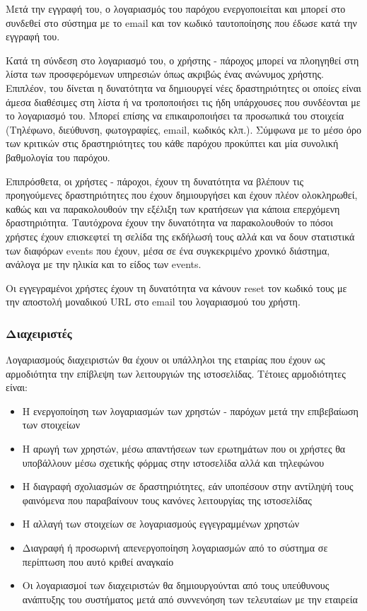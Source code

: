 \documentclass[letterpaper,6pt]{article}
\begin{document}
Μετά την εγγραφή του, ο λογαριασμός του παρόχου ενεργοποιείται και μπορεί στο συνδεθεί στο σύστημα με το email και τον κωδικό ταυτοποίησης που έδωσε κατά την εγγραφή του.

Κατά τη σύνδεση στο λογαριασμό του, ο χρήστης - πάροχος μπορεί να πλοηγηθεί στη λίστα των προσφερόμενων υπηρεσιών όπως ακριβώς ένας ανώνυμος χρήστης. Επιπλέον, του δίνεται η δυνατότητα να δημιουργεί νέες δραστηριότητες οι οποίες είναι άμεσα διαθέσιμες στη λίστα ή να τροποποιήσει τις ήδη υπάρχουσες που συνδέονται με το λογαριασμό του. Μπορεί επίσης να επικαιροποιήσει τα προσωπικά του στοιχεία (Τηλέφωνο, διεύθυνση, φωτογραφίες, email, κωδικός κλπ.). Σύμφωνα με το μέσο όρο των κριτικών στις δραστηριότητες του κάθε παρόχου προκύπτει και μία συνολική βαθμολογία του παρόχου.

Επιπρόσθετα, οι χρήστες - πάροχοι, έχουν τη δυνατότητα να βλέπουν τις προηγούμενες δραστηριότητες που έχουν δημιουργήσει και έχουν πλέον ολοκληρωθεί, καθώς και να παρακολουθούν την εξέλιξη των κρατήσεων για κάποια επερχόμενη δραστηριότητα. Ταυτόχρονα έχουν την δυνατότητα 
να παρακολουθούν το πόσοι χρήστες έχουν επισκεφτεί τη σελίδα της εκδήλωσή τους αλλά και να δουν στατιστικά των διαφόρων events που έχουν, μέσα σε ένα συγκεκριμένο χρονικό διάστημα, ανάλογα με την ηλικία και το είδος των events.
			
Οι εγγεγραμένοι χρήστες έχουν τη δυνατότητα να κάνουν reset τον κωδικό τους με την αποστολή μοναδικού URL στο email του λογαριασμού του χρήστη.

\subsubsection{Διαχειριστές}
Λογαριασμούς διαχειριστών θα έχουν οι υπάλληλοι της εταιρίας που έχουν ως αρμοδιότητα την επίβλεψη των λειτουργιών της ιστοσελίδας. Τέτοιες αρμοδιότητες είναι:
\begin{itemize}
  \item Η ενεργοποίηση των λογαριασμών των χρηστών - παρόχων μετά την επιβεβαίωση των στοιχείων
  \item Η αρωγή των χρηστών, μέσω απαντήσεων των ερωτημάτων που οι χρήστες θα υποβάλλουν μέσω σχετικής φόρμας στην ιστοσελίδα αλλά και τηλεφώνου
  \item Η διαγραφή σχολιασμών σε δραστηριότητες, εάν υποπέσουν στην αντίληψή τους φαινόμενα που παραβαίνουν τους κανόνες λειτουργίας της ιστοσελίδας
  \item Η αλλαγή των στοιχείων σε λογαριασμούς εγγεγραμμένων χρηστών
  \item Διαγραφή ή προσωρινή απενεργοποίηση λογαριασμών από το σύστημα σε περίπτωση που αυτό κριθεί αναγκαίο
  \item Οι λογαριασμοί των διαχειριστών θα δημιουργούνται από τους υπεύθυνους ανάπτυξης του συστήματος μετά από συννενόηση των τελευταίων με την εταιρεία
\end{itemize}
\end{document}
